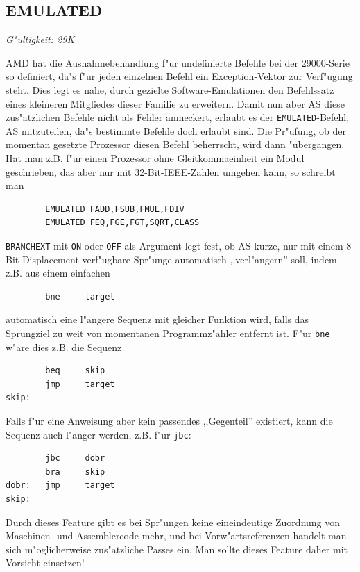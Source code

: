\documentclass[12pt,a4paper,twoside]{report}
\makeatletter
\newcommand{\tty}[1]{{\tt #1}}
\newcommand{\ttindex}[1]{\index{#1@{\tt #1}}}
\newcommand{\asname}{AS}
\makeatother
\begin{document}

\subsection{EMULATED}
\ttindex{EMULATED}

{\em G"ultigkeit: 29K}

AMD hat die Ausnahmebehandlung f"ur undefinierte Befehle bei der
29000-Serie so definiert, da"s f"ur jeden einzelnen Befehl ein
Exception-Vektor zur Verf"ugung steht.  Dies legt es nahe, durch
gezielte Software-Emulationen den Befehlssatz eines kleineren
Mitgliedes dieser Familie zu erweitern.  Damit nun aber \asname{} diese
zus"atzlichen Befehle nicht als Fehler anmeckert, erlaubt es der
\tty{EMULATED}-Befehl, \asname{} mitzuteilen, da"s bestimmte Befehle doch
erlaubt sind.  Die Pr"ufung, ob der momentan gesetzte Prozessor
diesen Befehl beherrscht, wird dann "ubergangen.  Hat man z.B. f"ur
einen Prozessor ohne Gleitkommaeinheit ein Modul geschrieben, das
aber nur mit 32-Bit-IEEE-Zahlen umgehen kann, so schreibt man
\begin{verbatim}
        EMULATED FADD,FSUB,FMUL,FDIV
        EMULATED FEQ,FGE,FGT,SQRT,CLASS
\end{verbatim}

{\tt BRANCHEXT} mit \tty{ON} oder \tty{OFF} als Argument legt fest, ob \asname{}
kurze, nur mit einem 8-Bit-Displacement verf"ugbare Spr"unge automatisch
,,verl"angern'' soll, indem z.B. aus einem einfachen
\begin{verbatim}
        bne     target
\end{verbatim}
automatisch eine l"angere Sequenz mit gleicher Funktion wird, falls das
Sprungziel zu weit von momentanen Programmz"ahler entfernt ist.  F"ur
{\tt bne} w"are dies z.B. die Sequenz
\begin{verbatim}
        beq     skip
        jmp     target
skip:
\end{verbatim}
Falls f"ur eine Anweisung aber kein passendes ,,Gegenteil'' existiert,
kann die Sequenz auch l"anger werden, z.B. f"ur {\tt jbc}:
\begin{verbatim}
        jbc     dobr
        bra     skip
dobr:   jmp     target
skip:
\end{verbatim}
Durch dieses Feature gibt es bei Spr"ungen keine eineindeutige Zuordnung
von Maschinen- und Assemblercode mehr, und bei Vorw"artsreferenzen handelt
man sich m"oglicherweise zus"atzliche Passes ein.  Man sollte dieses
Feature daher mit Vorsicht einsetzen!
\end{document}
